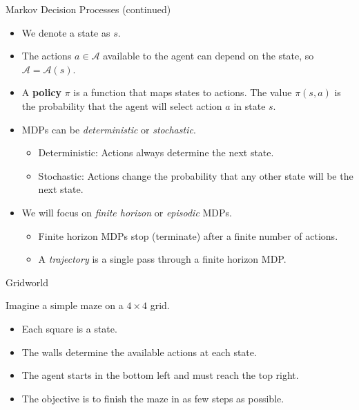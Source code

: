 \documentclass[9pt]{beamer}
\newcommand\pskip{\pause\bigskip}
\newcommand\lspace{\addtolength{\itemsep}{0.5\baselineskip}}
\begin{document}
\begin{frame}{Markov Decision Processes (continued)}
	
\begin{itemize}\lspace
	\item We denote a state as $s$.
	\item The actions $a\in\mathcal{A}$ available to the agent can depend on the state, so $\mathcal{A} = \mathcal{A}(s)$.
	\item A \textbf{policy} $\pi$ is a function that maps states to actions. The value $\pi(s,a)$ is the probability that the agent will select action $a$ in state $s$.
\end{itemize}
\pskip
\begin{itemize}\lspace
	\item MDPs can be \emph{deterministic} or \emph{stochastic}. 
	\begin{itemize}
		\item Deterministic: Actions always determine the next state.
		\item Stochastic: Actions change the probability that any other state will be the next state.
	\end{itemize}
	\item We will focus on \emph{finite horizon} or \emph{episodic} MDPs.
	\begin{itemize}
		\item Finite horizon MDPs stop (terminate) after a finite number of actions.
		\item A \emph{trajectory} is a single pass through a finite horizon MDP.
	\end{itemize}
\end{itemize}

\end{frame}

\begin{frame}{Gridworld}

Imagine a simple maze on a $4\times 4$ grid.
\begin{itemize}
	\item Each square is a state.
	\item The walls determine the available actions at each state.
	\item The agent starts in the bottom left and must reach the top right.
	\item The objective is to finish the maze in as few steps as possible.
\end{itemize}

\begin{center}
\end{center}

\end{frame}
\end{document}
